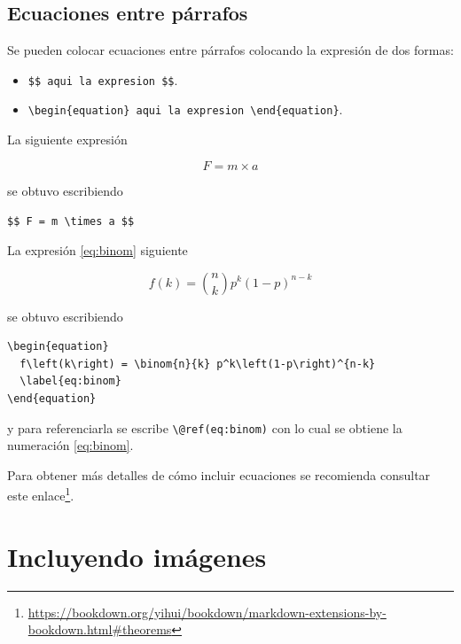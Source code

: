 \documentclass[
]{krantz}
\makeatletter
\providecommand{\tightlist}{%
  \setlength{\itemsep}{0pt}\setlength{\parskip}{0pt}}
\newenvironment{rmdblock}[1]
  {
  \begin{itemize}
  \renewcommand{\labelitemi}{
    \raisebox{-.7\height}[0pt][0pt]{
      {\setkeys{Gin}{width=3em,keepaspectratio}\texttt{[image: images/\#1]}}
    }
  }
  \setlength{\fboxsep}{1em}
  \begin{kframe}
  \item
  }
  {
  \end{kframe}
  \end{itemize}
  }
\newenvironment{rmdtip}
  {\begin{rmdblock}{tip}}
  {\end{rmdblock}}
\renewcommand{\href}[2]{#2\footnote{\url{#1}}}
\newenvironment{kframe}{%
\medskip{}
\setlength{\fboxsep}{.8em}
 \def\at@end@of@kframe{}%
 \ifinner\ifhmode%
  \def\at@end@of@kframe{\end{minipage}}%
  \begin{minipage}{\columnwidth}%
 \fi\fi%
 \def\FrameCommand##1{\hskip\@totalleftmargin \hskip-\fboxsep
 \colorbox{shadecolor}{##1}\hskip-\fboxsep
     \hskip-\linewidth \hskip-\@totalleftmargin \hskip\columnwidth}%
 \MakeFramed {\advance\hsize-\width
   \@totalleftmargin\z@ \linewidth\hsize
   \@setminipage}}%
 {\par\unskip\endMakeFramed%
 \at@end@of@kframe}
\makeatother
\begin{document}
\hypertarget{ecuaciones-entre-puxe1rrafos}{%
\section{Ecuaciones entre párrafos}\label{ecuaciones-entre-puxe1rrafos}}

Se pueden colocar ecuaciones entre párrafos colocando la expresión de dos formas:

\begin{itemize}
\tightlist
\item
  \texttt{\$\$\ aqui\ la\ expresion\ \$\$}.
\item
  \texttt{\textbackslash{}begin\{equation\}\ aqui\ la\ expresion\ \textbackslash{}end\{equation\}}.
\end{itemize}

La siguiente expresión

\[
F = m \times a
\]

se obtuvo escribiendo

\texttt{\$\$\ F\ =\ m\ \textbackslash{}times\ a\ \$\$}

La expresión \eqref{eq:binom} siguiente

\begin{equation} 
  f\left(k\right) = \binom{n}{k} p^k\left(1-p\right)^{n-k}
  \label{eq:binom}
\end{equation}

se obtuvo escribiendo

\begin{verbatim}
\begin{equation} 
  f\left(k\right) = \binom{n}{k} p^k\left(1-p\right)^{n-k}
  \label{eq:binom}
\end{equation} 
\end{verbatim}

y para referenciarla se escribe \texttt{\textbackslash{}@ref(eq:binom)} con lo cual se obtiene la numeración \eqref{eq:binom}.

\begin{rmdtip}
Para obtener más detalles de cómo incluir ecuaciones se recomienda consultar este \href{https://bookdown.org/yihui/bookdown/markdown-extensions-by-bookdown.html\#theorems}{enlace}.
\end{rmdtip}

\hypertarget{imagenes}{%
\chapter{Incluyendo imágenes}\label{imagenes}}
\end{document}
